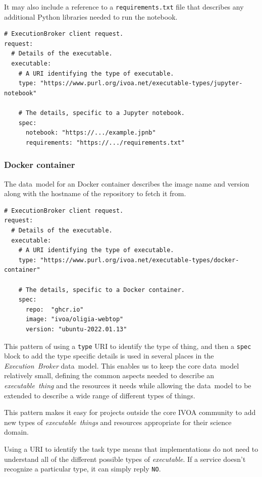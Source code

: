 \documentclass[11pt,a4paper]{ivoa}
\newcommand{\datamodel} {data~model}
\newcommand{\ivoa} {IVOA}
\newcommand{\executionbroker} {\textit{Execution~Broker}}
\newcommand{\executable} {\textit{executable}}
\newcommand{\executablething}[1] {\textit{executable~thing#1}}
\newcommand{\python} {Python}
\newcommand{\dockercontainer} {Docker container}
\newcommand{\codeword}[1] {\texttt{#1}}
\begin{document}
It may also include a reference to a \codeword{requirements.txt} file that describes any additional \python{}
libraries needed to run the notebook.
\begin{lstlisting}[]
# ExecutionBroker client request.
request:
  # Details of the executable.
  executable:
    # A URI identifying the type of executable.
    type: "https://www.purl.org/ivoa.net/executable-types/jupyter-notebook"

    # The details, specific to a Jupyter notebook.
    spec:
      notebook: "https://.../example.jpnb"
      requirements: "https://.../requirements.txt"
\end{lstlisting}

\subsubsection{\dockercontainer{}}
\label{dockercontainer}
The \datamodel{} for an \dockercontainer{} describes the image name and version
along with the hostname of the repository to fetch it from.

\begin{lstlisting}[]
# ExecutionBroker client request.
request:
  # Details of the executable.
  executable:
    # A URI identifying the type of executable.
    type: "https://www.purl.org/ivoa.net/executable-types/docker-container"

    # The details, specific to a Docker container.
    spec:
      repo:  "ghcr.io"
      image: "ivoa/oligia-webtop"
      version: "ubuntu-2022.01.13"
\end{lstlisting}

This pattern of using a \codeword{type} URI to identify the type of thing, and then a
\codeword{spec} block to add the type specific details is used in several places in the
\executionbroker{} \datamodel{}.
This enables us to keep the core \datamodel{} relatively small, defining the common aspects
needed to describe an \executablething{} and the resources it needs while allowing the
\datamodel{} to be extended to describe a wide range of different types of things.

This pattern makes it easy for projects outside the core \ivoa{} community to add new
types of \executablething{s} and resources appropriate for their science domain.

Using a URI to identify the task type means that implementations do not need to understand
all of the different possible types of \executable{}.
If a service doesn’t recognize a particular type, it can simply reply \codeword{NO}.
\end{document}
